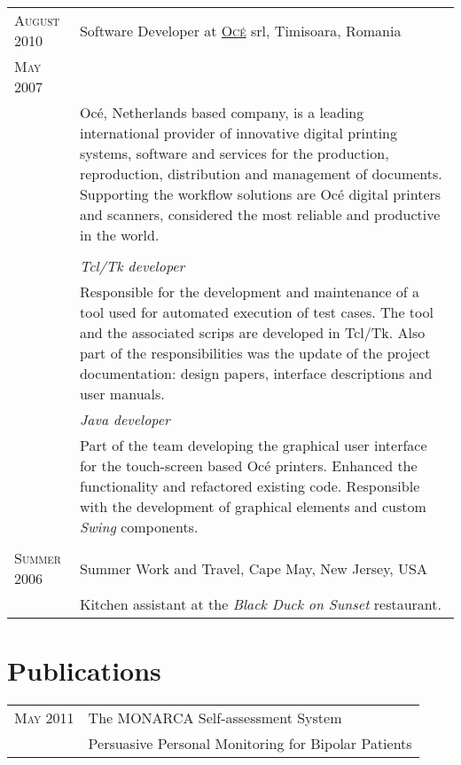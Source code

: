 \documentclass[a4paper,10pt]{article}
\begin{document}
\begin{tabular}{p{2.5cm}|p{11cm}}
 \raggedleft \textsc{August 2010} & Software Developer at \textsc{\href{http://www3.oce.com/ro/}{Oc\'e}} srl, Timisoara, Romania
 \\\raggedleft \textsc{May 2007}\\& 
 \footnotesize{Oc\'e, Netherlands based company, is a leading international
 provider of innovative digital printing systems, software
 and services for the production, reproduction, distribution and management of
 documents. Supporting the workflow solutions are Oc\'e digital  printers and
 scanners, considered the most reliable and productive in the world.}\\ \\ 
 &\emph{Tcl/Tk developer}\\
 &\footnotesize{Responsible for the development and maintenance of a tool
 used for automated execution of test cases. The tool and the associated scrips
 are developed in Tcl/Tk. Also part of the responsibilities was the update of
 the project documentation: design papers, interface descriptions and user
 manuals.}\\ 
 &\emph{Java developer}\\&\footnotesize{Part of the team developing the 
 graphical user interface for the touch-screen based Oc\'e printers. Enhanced
 the functionality and refactored existing code. Responsible with the development
 of graphical elements and custom \emph{Swing} components.} 
 \\\multicolumn{2}{c}{} \\ 
 \raggedleft \textsc{Summer 2006} & Summer Work and Travel, Cape May, New
 Jersey, USA\\&\footnotesize{Kitchen assistant at the \emph{Black Duck on Sunset} restaurant.}
\end{tabular}

\section{Publications}
\begin{tabular}{p{2.5cm}|p{11cm}}

 \raggedleft \textsc{May 2011} & The MONARCA Self-assessment System \\
 & Persuasive Personal Monitoring for Bipolar Patients \\
\end{tabular}

\end{document}
